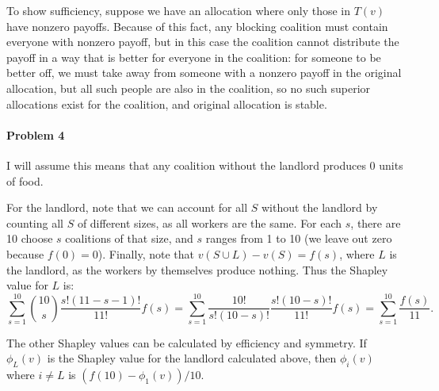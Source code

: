 \documentclass[12pt]{article}
\begin{document}
To show sufficiency, suppose we have an allocation where only those in $T(v)$
have nonzero payoffs. Because of this fact, any blocking coalition must
contain everyone with nonzero payoff, but in this case the coalition cannot
distribute the payoff in a way that is better for everyone in the coalition:
for someone to be better off, we must take away from someone with a nonzero
payoff in the original allocation, but all such people are also in the coalition,
so no such superior allocations exist for the coalition, and original allocation
is stable.

\paragraph{Problem 4}
I will assume this means that any coalition without the landlord produces 0
units of food.

For the landlord, note that we can account for all $S$ without the landlord by
counting all $S$ of different sizes, as all workers are the same. For each $s$,
there are 10 choose $s$ coalitions of that size, and $s$ ranges from 1 to 10
(we leave out zero because $f(0) = 0$).
Finally, note that $v(S\cup L) - v(S) = f(s)$, where $L$ is the landlord, as
the workers by themselves produce nothing. Thus the Shapley value for $L$ is:
\begin{displaymath}
  \sum_{s=1}^{10}\binom{10}{s}\frac{s!(11-s-1)!}{11!}f(s)
  = \sum_{s=1}^{10}\frac{10!}{s!(10-s)!}\frac{s!(10-s)!}{11!}f(s)
  = \sum_{s=1}^{10}\frac{f(s)}{11}.
\end{displaymath}

The other Shapley values can be calculated by efficiency and symmetry. If
$\phi_L(v)$ is the Shapley value for the landlord calculated above, then
$\phi_i(v)$ where $i \neq L$ is $(f(10)-\phi_1(v))/10$.

\end{document}
